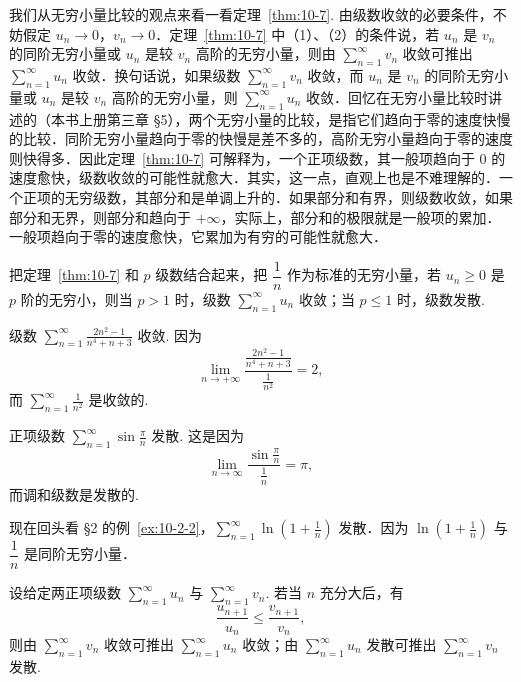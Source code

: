 我们从无穷小量比较的观点来看一看定理~\ref{thm:10-7}. 由级数收敛的必要条件，不妨假定 $u_{n}\to0$，$v_{n}\to0$．定理~\ref{thm:10-7} 中（1）、（2）的条件说，若 $u_{n}$ 是 $v_{n}$ 的同阶无穷小量或 $u_{n}$ 是较 $v_{n}$ 高阶的无穷小量，则由 $\sum_{n=1}^{\infty}v_{n}$ 收敛可推出 $\sum_{n=1}^{\infty}u_{n}$ 收敛．换句话说，如果级数 $\sum_{n=1}^{\infty}v_{n}$ 收敛，而 $u_{n}$ 是 $v_{n}$ 的同阶无穷小量或 $u_{n}$ 是较 $v_{n}$ 高阶的无穷小量，则 $\sum_{n=1}^{\infty}u_{n}$ 收敛．回忆在无穷小量比较时讲述的（本书上册第三章 \S5），两个无穷小量的比较，是指它们趋向于零的速度快慢的比较．同阶无穷小量趋向于零的快慢是差不多的，高阶无穷小量趋向于零的速度则快得多．因此定理~\ref{thm:10-7} 可解释为，一个正项级数，其一般项趋向于 $0$ 的速度愈快，级数收敛的可能性就愈大．其实，这一点，直观上也是不难理解的．一个正项的无穷级数，其部分和是单调上升的．如果部分和有界，则级数收敛，如果部分和无界，则部分和趋向于 $+\infty$，实际上，部分和的极限就是一般项的累加．一般项趋向于零的速度愈快，它累加为有穷的可能性就愈大．

把定理~\ref{thm:10-7} 和 $p$ 级数结合起来，把 $\dfrac{1}{n}$ 作为标准的无穷小量，若 $u_{n}\geqslant0$ 是 $p$ 阶的无穷小，则当 $p>1$ 时，级数 $\sum_{n=1}^{\infty}u_{n}$ 收敛；当 $p\leqslant1$ 时，级数发散.

\begin{example}\label{ex:10-3-2}
级数 $\displaystyle\sum_{n=1}^{\infty}\frac{2n^{2}-1}{n^{4}+n+3}$ 收敛. 因为
\[
\lim_{n\to+\infty}\frac{\frac{2n^{2}-1}{n^{4}+n+3}}{\frac{1}{n^{2}}}=2,
\]
而 $\displaystyle\sum_{n=1}^{\infty}\frac{1}{n^{2}}$ 是收敛的.
\end{example}

\begin{example}\label{ex:10-3-3}
正项级数 $\displaystyle\sum_{n=1}^{\infty}\sin\frac{\pi}{n}$ 发散. 这是因为
\[
\lim_{n\to\infty}\frac{\sin\frac{\pi}{n}}{\frac{1}{n}}=\pi,
\]
而调和级数是发散的.
\end{example}

现在回头看 \S2 的例~\ref{ex:10-2-2}，$\sum_{n=1}^{\infty}\ln\left(1+\frac{1}{n}\right)$ 发散．因为 $\ln\left(1+\frac{1}{n}\right)$ 与 $\dfrac{1}{n}$ 是同阶无穷小量．

\begin{theorem}[比较判别法的另一形式]\label{thm:10-8}
设给定两正项级数 $\sum_{n=1}^{\infty}u_{n}$ 与 $\sum_{n=1}^{\infty}v_{n}$. 若当 $n$ 充分大后，有
\[
\frac{u_{n+1}}{u_{n}}\leqslant\frac{v_{n+1}}{v_{n}},
\]
则由 $\sum_{n=1}^{\infty}v_{n}$ 收敛可推出 $\sum_{n=1}^{\infty}u_{n}$ 收敛；由 $\sum_{n=1}^{\infty}u_{n}$ 发散可推出 $\sum_{n=1}^{\infty}v_{n}$ 发散.
\end{theorem}

